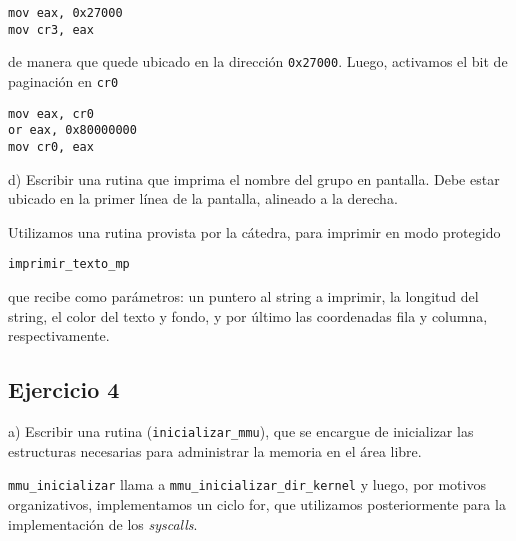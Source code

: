 \begin{verbatim}
mov eax, 0x27000
mov cr3, eax 
\end{verbatim}

de manera que quede ubicado en la direcci\'on \verb|0x27000|. Luego, activamos el bit de paginaci\'on en \verb|cr0|

\begin{verbatim}
mov eax, cr0
or eax, 0x80000000
mov cr0, eax 
\end{verbatim}


\vspace*{0.5cm} \noindent



\noindent
d) Escribir una rutina que imprima el nombre del grupo en pantalla. Debe estar ubicado en la primer línea
de la pantalla, alineado a la derecha.

\vspace*{0.3cm}

Utilizamos una rutina provista por la c\'atedra, para imprimir en modo protegido

\verb|imprimir_texto_mp|

que recibe como par\'ametros: un puntero al string a imprimir, la longitud del string, el color del texto y fondo, 
y por \'ultimo las coordenadas fila y columna, respectivamente.

\vspace*{0.5cm} \noindent



\newpage





\subsection*{Ejercicio 4}
\vspace*{0.5cm}

\noindent
a) Escribir una rutina (\verb|inicializar_mmu|), que se encargue de inicializar las estructuras necesarias para administrar la memoria en el área libre.

\vspace*{0.3cm}

\verb|mmu_inicializar| llama a \verb|mmu_inicializar_dir_kernel| y luego, por motivos organizativos, implementamos 
un ciclo for, que utilizamos posteriormente para la implementaci\'on de los \textit{syscalls}.

\vspace*{0.5cm} \noindent



